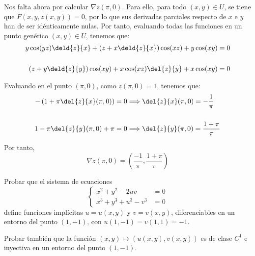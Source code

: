 \begin{ejercicio}
    Nos falta ahora por calcular $\nabla z(\pi,0)$. Para ello, para todo $(x,y)\in U$, se tiene que $F(x,y,z(x,y))=0$, por lo que sus derivadas parciales respecto de $x$ e $y$ han de ser idénticamente nulas.
    Por tanto, evaluando todas las funciones en un punto genérico $(x,y)\in U$, tenemos que:
    \begin{align*}
        y\cos(yz) \deld{z}{x} + \left(z+x\deld{z}{x}\right)\cos(xz) +y \cos(xy) &= 0 \\ \\
        \left(z+y\deld{z}{y}\right)\cos(xy) +x \cos(xz)\del{z}{y} + x\cos(xy) &= 0
    \end{align*}

    Evaluando en el punto $(\pi,0)$, como $z(\pi,0)=1$, tenemos que:
    \begin{align*}
        -\left(1+\pi\del{z}{x}(\pi, 0)\right) &= 0 \Longrightarrow \del{z}{x}(\pi, 0) = -\frac{1}{\pi} \\ \\
        1-\pi\del{z}{y}(\pi, 0) + \pi &= 0 \Longrightarrow \del{z}{y}(\pi, 0) = \frac{1+\pi}{\pi}
    \end{align*}

    Por tanto,
    \begin{equation*}
        \nabla z(\pi,0) = \left(
                \frac{-1}{\pi} , \frac{1+\pi}{\pi}
        \right)
    \end{equation*}
    
\end{ejercicio}



\begin{ejercicio}
    Probar que el sistema de ecuaciones
    \begin{equation*}
        \left\{
            \begin{array}{ll}
                x^2 + y^2-2uv &= 0 \\
                x^3+y^3+u^3-v^3 &= 0
            \end{array}
        \right.
    \end{equation*}
    define funciones implícitas $u=u(x,y)$ y $v=v(x,y)$, diferenciables en un entorno
    del punto $(1,-1)$, con $u(1,-1)=v(1,1)=-1$.

    Probar también que la función $(x,y)\mapsto \left(u(x,y), v(x,y)\right)$ es de clase $C^1$
    e inyectiva en un entorno del punto $(1,-1)$.
\end{ejercicio}



